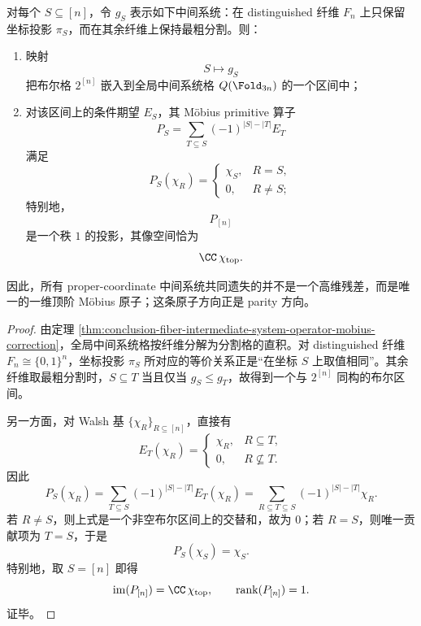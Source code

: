 \begin{theorem}\label{thm:conclusion-period3-fiber-boolean-interval-top-mobius-parity}
对每个 \(S\subseteq[n]\)，令 \(g_S\) 表示如下中间系统：在 distinguished 纤维 \(F_n\) 上只保留坐标投影 \(\pi_S\)，而在其余纤维上保持最粗分割。则：
\begin{enumerate}
  \item 映射
  \[
  S\longmapsto g_S
  \]
  把布尔格 \(2^{[n]}\) 嵌入到全局中间系统格 \(Q(\Fold_{3n})\) 的一个区间中；
  \item 对该区间上的条件期望 \(E_S\)，其 Möbius primitive 算子
  \[
  P_S=\sum_{T\subseteq S}(-1)^{|S|-|T|}E_T
  \]
  满足
  \[
  P_S(\chi_R)=
  \begin{cases}
  \chi_S,& R=S,\\
  0,& R\neq S;
  \end{cases}
  \]
  特别地，
  \[
  P_{[n]}
  \]
  是一个秩 \(1\) 的投影，其像空间恰为
  \[
  \CC\,\chi_{\mathrm{top}}.
  \]
\end{enumerate}
因此，所有 proper-coordinate 中间系统共同遗失的并不是一个高维残差，而是唯一的一维顶阶 Möbius 原子；这条原子方向正是 parity 方向。
\end{theorem}
\begin{proof}
由定理 \ref{thm:conclusion-fiber-intermediate-system-operator-mobius-correction}，全局中间系统格按纤维分解为分割格的直积。对 distinguished 纤维 \(F_n\cong\{0,1\}^n\)，坐标投影 \(\pi_S\) 所对应的等价关系正是“在坐标 \(S\) 上取值相同”。其余纤维取最粗分割时，\(S\subseteq T\) 当且仅当 \(g_S\le g_T\)，故得到一个与 \(2^{[n]}\) 同构的布尔区间。

另一方面，对 Walsh 基 \(\{\chi_R\}_{R\subseteq[n]}\)，直接有
\[
E_T(\chi_R)=
\begin{cases}
\chi_R,& R\subseteq T,\\
0,& R\not\subseteq T.
\end{cases}
\]
因此
\[
P_S(\chi_R)
=
\sum_{T\subseteq S}(-1)^{|S|-|T|}E_T(\chi_R)
=
\sum_{R\subseteq T\subseteq S}(-1)^{|S|-|T|}\chi_R.
\]
若 \(R\neq S\)，则上式是一个非空布尔区间上的交替和，故为 \(0\)；若 \(R=S\)，则唯一贡献项为 \(T=S\)，于是
\[
P_S(\chi_S)=\chi_S.
\]
特别地，取 \(S=[n]\) 即得
\[
\mathrm{im}(P_{[n]})=\CC\,\chi_{\mathrm{top}},
\qquad
\mathrm{rank}(P_{[n]})=1.
\]
证毕。
\end{proof}



